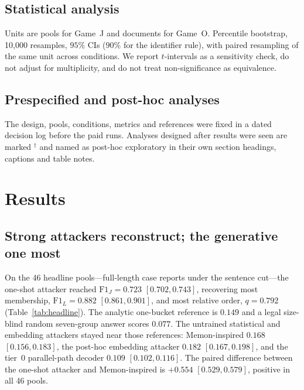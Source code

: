 \documentclass[sigconf,review]{acmart}
\newcommand{\FJ}{\ensuremath{\mathrm{F1}_{J}}}
\newcommand{\FL}{\ensuremath{\mathrm{F1}_{L}}}
\newcommand{\posthoc}{\ensuremath{^{\dagger}}}
\begin{document}
\subsection{Statistical analysis}
\label{sec:stats}
Units are pools for Game~J and documents for Game~O. Percentile bootstrap,
10{,}000 resamples, $95\%$ CIs ($90\%$ for the identifier rule), with paired
resampling of the same unit across conditions. We report $t$-intervals as a
sensitivity check, do not adjust for multiplicity, and do not treat
non-significance as equivalence.

\subsection{Prespecified and post-hoc analyses}
\label{sec:prespec}
The design, pools, conditions, metrics and references were fixed in a dated
decision log before the paid runs. Analyses designed after results were seen
are marked \posthoc{} and named as post-hoc exploratory in their own section
headings, captions and table notes.

\section{Results}
\label{sec:results}

\subsection{Strong attackers reconstruct; the generative one most}
\label{sec:res-attackers}

On the 46 headline pools---full-length case reports under the sentence
cut---the one-shot attacker reached $\FJ = 0.723$ $[0.702, 0.743]$, recovering
most membership, $\FL = 0.882$ $[0.861, 0.901]$, and most relative order,
$q = 0.792$ (Table~\ref{tab:headline}). The analytic one-bucket reference is
$0.149$ and a legal size-blind random seven-group answer scores $0.077$. The
untrained statistical and embedding attackers stayed near those references:
Memon-inspired $0.168$ $[0.156, 0.183]$, the post-hoc embedding attacker
$0.182$ $[0.167, 0.198]$, and the tier~0 parallel-path decoder $0.109$
$[0.102, 0.116]$. The paired difference between the one-shot attacker and
Memon-inspired is $+0.554$ $[0.529, 0.579]$, positive in all 46 pools.
\end{document}
